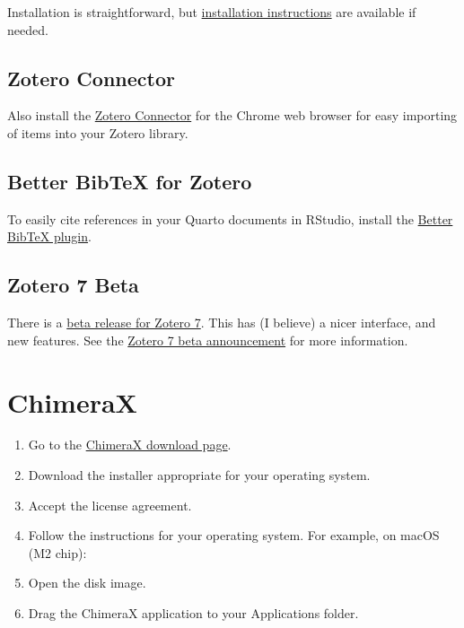 \documentclass[
  letterpaper,
  DIV=11,
  numbers=noendperiod]{scrreprt}
\providecommand{\tightlist}{%
  \setlength{\itemsep}{0pt}\setlength{\parskip}{0pt}}\usepackage{longtable,booktabs,array}
\begin{document}
Installation is straightforward, but
\href{Installation\%20Instructions}{installation instructions} are
available if needed.

\subsection{Zotero Connector}\label{zotero-connector}

Also install the
\href{https://chromewebstore.google.com/detail/zotero-connector/ekhagklcjbdpajgpjgmbionohlpdbjgc?pli=1}{Zotero
Connector} for the Chrome web browser for easy importing of items into
your Zotero library.

\subsection{Better BibTeX for Zotero}\label{better-bibtex-for-zotero}

To easily cite references in your Quarto documents in RStudio, install
the \href{https://retorque.re/zotero-better-bibtex/}{Better BibTeX
plugin}.

\subsection{Zotero 7 Beta}\label{zotero-7-beta}

There is a \href{https://www.zotero.org/support/beta_builds}{beta
release for Zotero 7}. This has (I believe) a nicer interface, and new
features. See the
\href{https://forums.zotero.org/discussion/105094/announcing-the-zotero-7-beta}{Zotero
7 beta announcement} for more information.

\section{ChimeraX}\label{chimerax}

\begin{enumerate}
\def\labelenumi{\arabic{enumi}.}
\tightlist
\item
  Go to the
  \href{https://www.cgl.ucsf.edu/chimerax/download.html}{ChimeraX
  download page}.
\item
  Download the installer appropriate for your operating system.
\item
  Accept the license agreement.
\item
  Follow the instructions for your operating system. For example, on
  macOS (M2 chip):
\item
  Open the disk image.
\item
  Drag the ChimeraX application to your Applications folder.
\end{enumerate}
\end{document}
